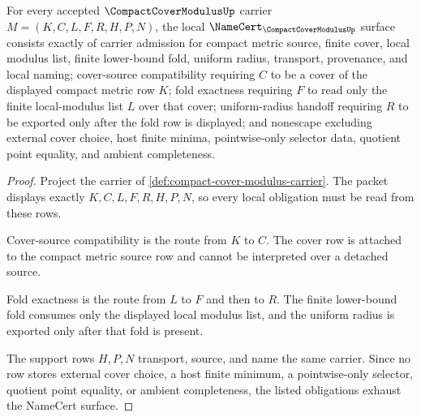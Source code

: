 \begin{theorem}
\label{thm:compact-cover-modulus-namecert-obligations}
For every accepted $\CompactCoverModulusUp$ carrier $M=(K,C,L,F,R,H,P,N)$, the local $\NameCert_{\CompactCoverModulusUp}$ surface consists exactly of carrier admission for compact metric source, finite cover, local modulus list, finite lower-bound fold, uniform radius, transport, provenance, and local naming; cover-source compatibility requiring $C$ to be a cover of the displayed compact metric row $K$; fold exactness requiring $F$ to read only the finite local-modulus list $L$ over that cover; uniform-radius handoff requiring $R$ to be exported only after the fold row is displayed; and nonescape excluding external cover choice, host finite minima, pointwise-only selector data, quotient point equality, and ambient completeness.
\end{theorem}
\begin{proof}
Project the carrier of \autoref{def:compact-cover-modulus-carrier}. The packet displays exactly $K,C,L,F,R,H,P,N$, so every local obligation must be read from these rows.

Cover-source compatibility is the route from $K$ to $C$. The cover row is attached to the compact metric source row and cannot be interpreted over a detached source.

Fold exactness is the route from $L$ to $F$ and then to $R$. The finite lower-bound fold consumes only the displayed local modulus list, and the uniform radius is exported only after that fold is present.

The support rows $H,P,N$ transport, source, and name the same carrier. Since no row stores external cover choice, a host finite minimum, a pointwise-only selector, quotient point equality, or ambient completeness, the listed obligations exhaust the NameCert surface.
\end{proof}

